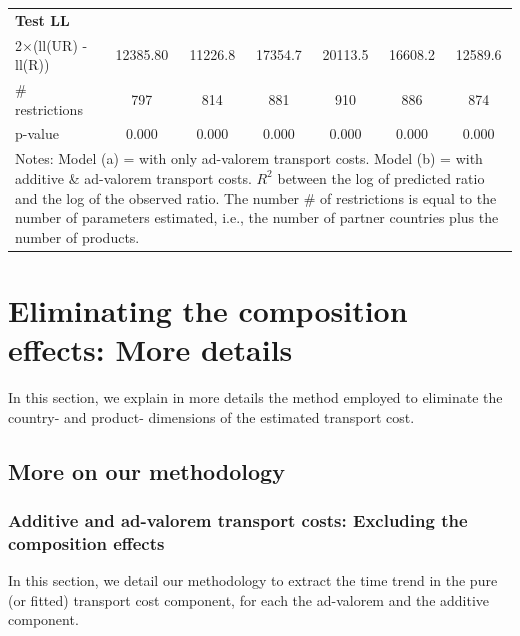 \documentclass[a4paper,11pt]{article}
\begin{document}
\begin{table}[htbp]
\begin{center}
{\begin{tabular}{l|cccccc}
\textbf{Test LL} &       &       & & &  & \\
2$\times$(ll(UR) -ll(R)) & 12385.80 & 11226.8 & \multicolumn{1}{c}{17354.7} & \multicolumn{1}{c}{20113.5} & \multicolumn{1}{c}{16608.2} & \multicolumn{1}{c}{12589.6} \\
\# restrictions  & 797   & 814   & \multicolumn{1}{c}{881} & \multicolumn{1}{c}{910} & \multicolumn{1}{c}{886} & \multicolumn{1}{c}{874} \\
p-value & 0.000 & 0.000 & \multicolumn{1}{c}{0.000} & \multicolumn{1}{c}{0.000} & \multicolumn{1}{c}{0.000} & \multicolumn{1}{c}{0.000} \\
\hline\hline
\multicolumn{7}{l}{\parbox[l]{13cm}{ \vspace{7pt}\scriptsize{Notes: Model (a) = with only ad-valorem transport costs.
Model (b) = with additive \& ad-valorem
transport costs.
$R^{2}$ between the log of predicted ratio and the log of the observed ratio.
The number \# of restrictions is equal to the number of parameters estimated, i.e., the number of partner countries plus the number of products.}}}
\end{tabular}%
}
\end{center}
\end{table}%

\newpage


\clearpage
\setcounter{table}{0}
\setcounter{figure}{0}
\renewcommand{\thefigure}{D.\arabic{figure}}
\renewcommand{\thetable}{D.\arabic{table}}

\section{Eliminating the composition effects: More details \label{app:comp-effects}}

In this section, we explain in more details the method employed to eliminate the country- and product- dimensions of the estimated transport cost.

\subsection{More on our methodology}


\subsubsection{Additive and ad-valorem transport costs: Excluding the composition effects}

In this section, we detail our methodology to extract the time trend in the pure (or fitted) transport cost component, for each the ad-valorem and the additive component.
\end{document}
